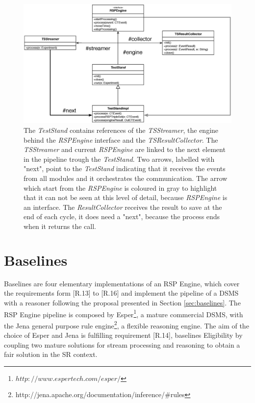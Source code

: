 \begin{figure}[p!]
  \centering
	\includegraphics[width=0.9\linewidth]{images/uml_teststand_modules}
	\caption[\name \textsc{TestStand} and Modules  - UML Schema] {The \textit{TestStand} contains references of the \textit{TSStreamer}, the engine behind the \textit{RSPEngine} interface and the \textit{TSResultCollector}. The \textit{TSStreamer} and current \textit{RSPEngine} are linked to the next element in the pipeline trough the \textit{TestStand}. Two arrows, labelled with "next", point to the  \textit{TestStand} indicating that it receives the events from all modules and it orchestrates the communication. The arrow which start from the \textit{RSPEngine} is coloured in gray to highlight that it can not be seen at this level of detail, because \textit{RSPEngine} is an interface. The \textit{ResultCollector} receives the result to save at the end of each cycle, it does need a "next", because the process ends when it returns the call.} 
  	\label{fig:uml_teststand_modules}
\end{figure}

\pagebreak

\section{Baselines}\label{sec:baselines-impl}

\name Baselines are four elementary implementations of an RSP Engine, which  cover the requirements form [R.13] to [R.16] and implement the pipeline of a DSMS with a reasoner following the proposal presented in Section \ref{sec:baselines}. 
The RSP Engine pipeline is composed by Esper\footnote{$http://www.espertech.com/esper/$}, a mature commercial DSMS, with the Jena general purpose rule engine\footnote{http://jena.apache.org/documentation/inference/\#rules}, a flexible reasoning engine.  The aim of the choice of Esper and Jena is fulfilling requirement [R.14], baselines Eligibility by coupling two mature solutions for stream processing and reasoning to obtain a fair solution in the SR context.


